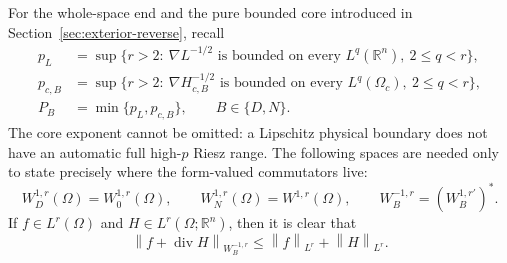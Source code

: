 \documentclass[12pt]{amsart}
\newcommand\R{\mathbb{R}}
\newcommand{\cdo}{\, \cdot \,}
\newcommand{\diver}{\operatorname{div}}
\newcommand{\ip}[2]{\left\langle #1,#2\right\rangle}
\newcommand{\norm}[2]{\left\lVert #1\right\rVert_{#2}}
\newcommand{\abs}[1]{\left\lvert #1\right\rvert}
\newtheorem{lemma}[theorem]{Lemma}
\theoremstyle{remark}
\begin{document}
For the whole-space end and the pure bounded core introduced in
Section~\ref{sec:exterior-reverse}, recall
\begin{align*}
 p_L&=\sup\bigl\{r>2:\ \nabla L^{-1/2}\text{ is bounded on every }
                  L^q(\R^n),\ 2\leq q<r\bigr\},\\
 p_{c,B}&=\sup\bigl\{r>2:\ \nabla H_{c,B}^{-1/2}\text{ is bounded on every }
                  L^q(\Omega_c),\ 2\leq q<r\bigr\},\\
 P_B&=\min\{p_L,p_{c,B}\},\qquad B\in\{D,N\}.
\end{align*}
The core exponent cannot be omitted: a Lipschitz physical boundary does not have
an automatic full high-$p$ Riesz range.  The following spaces are needed
only to state precisely where the form-valued commutators live:
\[
 W_D^{1,r}(\Omega)=W_0^{1,r}(\Omega),\qquad
 W_N^{1,r}(\Omega)=W^{1,r}(\Omega),
 \qquad W_B^{-1,r}=(W_B^{1,r'})^*.
\]
If $f\in L^r(\Omega)$ and $H\in L^r(\Omega;\R^n)$, then it is clear that
\begin{equation}\label{eq:compact-form-norm}
 \norm{f+\diver H}{W_B^{-1,r}}
 \leq \norm f{L^r}+\norm H{L^r}.
\end{equation}


\end{document}
